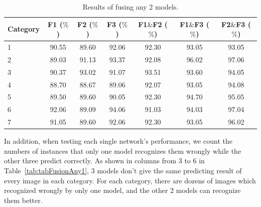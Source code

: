 \documentclass[12pt]{article}
\begin{document}
\begin{table}[ht]
  \renewcommand{\arraystretch}{1.3}
  \caption{Results of fusing any 2 models.}
  \label{tab:tabFusionAny2}
  \begin{center}
  \begin{tabular}{|l|c|c|c|c|c|c|}
    \hline
        
        Category & F1 ($\%$) & F2 ($\%$) & F3 ($\%$) 
        & F1$\&$F2 ($\%$) 
        & F1$\&$F3 ($\%$)  
        & F2$\&$F3 ($\%$)  \\
        
        \hline
        
        1 & 90.55 & 89.60 & 92.06 
        & 92.30 & 93.05 & 93.05 \\
        
        2 & 89.03 & 91.13 & 93.37 
        & 92.08 & 96.02 & 97.06 \\
        
        3 & 90.37 & 93.02 & 91.07 
        & 93.51 & 93.60 & 94.05 \\
        
        4 & 88.70 & 88.67 & 89.06 
        & 92.07 & 93.05 & 94.08 \\
        
        5 & 89.50 & 89.60 & 90.05 
        & 92.30 & 94.70 & 95.05 \\
        
        6 & 92.06 & 89.09 & 94.06 
        & 91.03 & 94.03 & 97.04 \\
        
        7 & 91.05 & 89.60 & 92.06 
        & 92.30 & 93.05 & 96.02 \\
        
        \hline
  \end{tabular}
  \end{center}
  \end{table}

In addition, when testing each single 
network’s performance, we count the numbers 
of instances that only one model recognizes 
them wrongly while the other three predict 
correctly. As shown in columns from 3 to 6 
in Table~\ref{tab:tabFusionAny1}, 3 models 
don’t give the same predicting result of
every image in each category. For each 
category, there are dozens of images which 
recognized wrongly by only one model, 
and the other 2 models can recognize them 
better.
\end{document}

